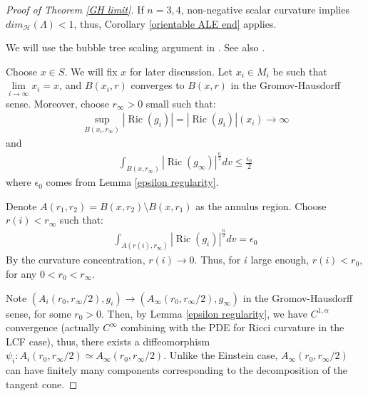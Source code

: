 \documentclass[12pt]{amsart}
\theoremstyle{definition}
\begin{document}
\begin{proof}[Proof of Theorem \ref{GH limit}]
    If $n = 3,4$, non-negative scalar curvature implies $dim_\mathcal{H}(\Lambda) < 1$, thus, Corollary \ref{orientable ALE end} applies.
    
    We will use the bubble tree scaling argument in \cite{Bubble}. See also \cite{TV2}.

    Choose $x\in S$. We will fix $x$ for later discussion. Let $x_i\in M_i$ be such that $\lim\limits_{i\to\infty} x_i = x$, and $B(x_i, r)$ converges to $B(x,r)$ in the Gromov-Hausdorff sense. Moreover, choose $r_\infty > 0$ small such that:
    \begin{align*}
        \sup_{B(x_i, r_\infty)}|\operatorname{Ric}(g_i)| = |\operatorname{Ric}(g_i)|(x_i) \to \infty
    \end{align*}
    and 
    \begin{align*}
        \int_{B(x,r_\infty)} |\operatorname{Ric}(g_\infty)|^{\frac{n}{2}} dv \leq \frac{\epsilon_0}{2}
    \end{align*}
    where $\epsilon_0$ comes from Lemma \ref{epsilon regularity}. 

    Denote $A(r_1, r_2) = B(x, r_2)\setminus B(x,r_1)$ as the annulus region. Choose $r(i)< r_\infty$ such that:
    \begin{align*}
        \int_{A(r(i), r_\infty)}|\operatorname{Ric}(g_i)|^{\frac{n}{2}} dv = \epsilon_0
    \end{align*}
    By the curvature concentration, $r(i)\to 0$. Thus, for $i$ large enough, $r(i)<r_0$, for any $0<r_0 < r_\infty$.

    Note $(A_i(r_0, r_\infty/2), g_i)\to (A_\infty(r_0, r_\infty/2), g_\infty)$ in the Gromov-Hausdorff sense, for some $r_0 >0$. Then, by Lemma \ref{epsilon regularity}, we have $C^{1,\alpha}$ convergence (actually $C^\infty$ combining with the PDE for Ricci curvature in the LCF case), thus, there exists a diffeomorphism $\psi_i: A_i(r_0, r_\infty/2) \simeq A_\infty(r_0, r_\infty/2)$. Unlike the Einstein case, $A_\infty(r_0, r_\infty/2)$ can have finitely many components corresponding to the decomposition of the tangent cone.


\end{proof}
\end{document}
